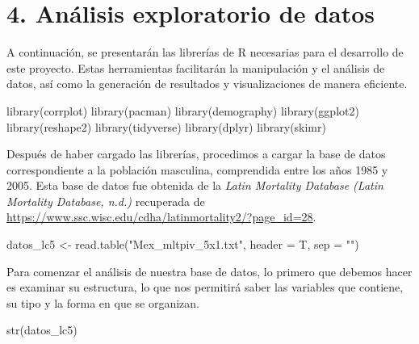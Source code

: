 \documentclass[
]{article}
\newenvironment{Shaded}{\begin{snugshade}}{\end{snugshade}}
\newcommand{\AttributeTok}[1]{\textcolor[rgb]{0.77,0.63,0.00}{#1}}
\newcommand{\FunctionTok}[1]{\textcolor[rgb]{0.00,0.00,0.00}{#1}}
\newcommand{\NormalTok}[1]{#1}
\newcommand{\OtherTok}[1]{\textcolor[rgb]{0.56,0.35,0.01}{#1}}
\newcommand{\StringTok}[1]{\textcolor[rgb]{0.31,0.60,0.02}{#1}}
\begin{document}
\hypertarget{anuxe1lisis-exploratorio-de-datos}{%
\section{4. Análisis exploratorio de
datos}\label{anuxe1lisis-exploratorio-de-datos}}

\justifying

A continuación, se presentarán las librerías de R necesarias para el
desarrollo de este proyecto. Estas herramientas facilitarán la
manipulación y el análisis de datos, así como la generación de
resultados y visualizaciones de manera eficiente.

\begin{Shaded}
\begin{Highlighting}[]
\FunctionTok{library}\NormalTok{(corrplot)}
\FunctionTok{library}\NormalTok{(pacman)}
\FunctionTok{library}\NormalTok{(demography)}
\FunctionTok{library}\NormalTok{(ggplot2)}
\FunctionTok{library}\NormalTok{(reshape2)}
\FunctionTok{library}\NormalTok{(tidyverse)}
\FunctionTok{library}\NormalTok{(dplyr)}
\FunctionTok{library}\NormalTok{(skimr)}
\end{Highlighting}
\end{Shaded}

Después de haber cargado las librerías, procedimos a cargar la base de
datos correspondiente a la población masculina, comprendida entre los
años 1985 y 2005. Esta base de datos fue obtenida de la \emph{Latin
Mortality Database (Latin Mortality Database, n.d.)} recuperada de
\url{https://www.ssc.wisc.edu/cdha/latinmortality2/?page_id=28}.

\begin{Shaded}
\begin{Highlighting}[]
\NormalTok{datos\_lc5 }\OtherTok{\textless{}{-}} \FunctionTok{read.table}\NormalTok{(}\StringTok{"Mex\_mltpiv\_5x1.txt"}\NormalTok{, }\AttributeTok{header =}\NormalTok{ T, }\AttributeTok{sep =} \StringTok{""}\NormalTok{) }
\end{Highlighting}
\end{Shaded}

Para comenzar el análisis de nuestra base de datos, lo primero que
debemos hacer es examinar su estructura, lo que nos permitirá saber las
variables que contiene, su tipo y la forma en que se organizan.

\begin{Shaded}
\begin{Highlighting}[]
\FunctionTok{str}\NormalTok{(datos\_lc5)}
\end{Highlighting}
\end{Shaded}
\end{document}
